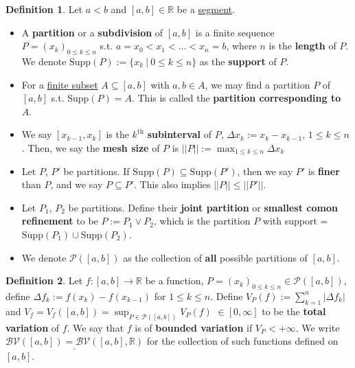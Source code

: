 \documentclass[12pt,a4paper]{article}
\theoremstyle{definition}
\newtheorem{defin}{Definition}[subsection]
\newenvironment{definition}{
  \begin{defin}
}{
  \end{defin}
  \vspace{0.125em}
}
\begin{document}
\begin{definition}
  Let $a < b$ and $[a, b] \in \mathbb{R}$ be a \underline{segment}.
  \begin{itemize}
    \item A \textbf{partition} or a \textbf{subdivision} of $[a, b]$ is a finite sequence $P = (x_k)_{0 \leq k \leq n}$ s.t. $a = x_0 < x_1 < \dots < x_n = b$, where $n$ is the \textbf{length} of $P$. We denote \underline{$\text{Supp}(P):=\{x_k\ |\ 0 \leq k \leq n\}$} as the \textbf{support} of $P$.
    \item For a \underline{finite subset} $A \subseteq [a, b]$ with $a, b \in A$, we may find a partition $P$ of $[a, b]$ s.t. Supp$(P) = A$. This is called the \textbf{partition corresponding to $A$}.
    \item We say $[x_{k -  1}, x_k]$ is the $k^{\text{th}}$ \textbf{subinterval} of $P$, \underline{$\Delta x_k := x_k - x_{k - 1}$}, $1 \leq k \leq n$. Then, we say the \textbf{mesh size} of $P$ is \underline{$||P|| := \max_{1 \leq k \leq n} \Delta x_k$}
    \item Let $P$, $P'$ be partitions. If $\text{Supp}(P) \subseteq \text{Supp}(P')$, then we say $P'$ is \textbf{finer} than $P$, and we say \underline{$P \subseteq P'$}. This also implies \underline{$||P|| \leq ||P'||$}.
    \item Let $P_1$, $P_2$ be partitions. Define their \textbf{joint partition} or \textbf{smallest comon refinement} to be \underline{$P := P_1 \vee P_2$}, which is the partition $P$ with support = \underline{$\text{Supp}(P_1) \cup \text{Supp}(P_2)$}.
    \item We denote \underline{$\mathcal{P}([a, b])$} as the collection of \textbf{all} possible partitions of $[a, b]$.
  \end{itemize}
\end{definition}

\begin{definition}
  Let $f: [a, b] \rightarrow \mathbb{R}$ be a function, $P = (x_k)_{0 \leq k \leq n} \in \mathcal{P}([a, b])$, define \underline{$\Delta f_k := f(x_k) - f(x_{k - 1})$} for $1 \leq k \leq n$. Define \underline{$V_P(f) := \sum_{k = 1}^{n} |\Delta f_k|$} and \underline{$V_f = V_f([a, b]) = \sup_{P \in \mathcal{P}([a, b])} V_P(f)$} $\in [0, \infty]$ to be the \textbf{total variation} of $f$. We say that $f$ is of \textbf{bounded variation} if $V_P < +\infty$. We write $\underline{\mathcal{BV}([a, b]) = \mathcal{BV}([a, b], \mathbb{R})}$ for the collection of such functions defined on $[a, b]$.
\end{definition}
\end{document}
